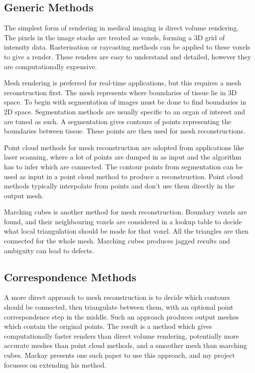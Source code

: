 \documentclass[11pt]{article}
\begin{document}
\subsection{Generic Methods}

The simplest form of rendering in medical imaging is direct volume rendering. The pixels in the image stacks are treated as voxels, forming a 3D grid of intensity data. Rasterisation or raycasting methods can be applied to these voxels to give a render. These renders are easy to understand and detailed, however they are computationally expensive.

Mesh rendering is preferred for real-time applications, but this requires a mesh reconstruction first. The mesh represents where boundaries of tissue lie in 3D space. To begin with segmentation of images must be done to find boundaries in 2D space. Segmentation methods are usually specific to an organ of interest and are tuned as such. A segmentation gives contours of points representing the boundaries between tissue. These points are then used for mesh reconstructions.

Point cloud methods for mesh reconstruction are adopted from applications like laser scanning, where a lot of points are dumped in as input and the algorithm has to infer which are connected. The contour points from segmentation can be used as input in a point cloud method to produce a reconstruction. Point cloud methods typically interpolate from points and don't use them directly in the output mesh.

Marching cubes is another method for mesh reconstruction. Boundary voxels are found, and their neighbouring voxels are considered in a lookup table to decide what local triangulation should be made for that voxel. All the triangles are then connected for the whole mesh. Marching cubes produces jagged results and ambiguity can lead to defects.

\subsection{Correspondence Methods}

A more direct approach to mesh reconstruction is to decide which contours should be connected, then triangulate between them, with an optional point correspondence step in the middle. Such an approach produces output meshes which contain the original points. The result is a method which gives computationally faster renders than direct volume rendering, potentially more accurate meshes than point cloud methods, and a smoother mesh than marching cubes. Mackay \cite{mackay2019robust} presents one such paper to use this approach, and my project focusses on extending his method.
\end{document}
